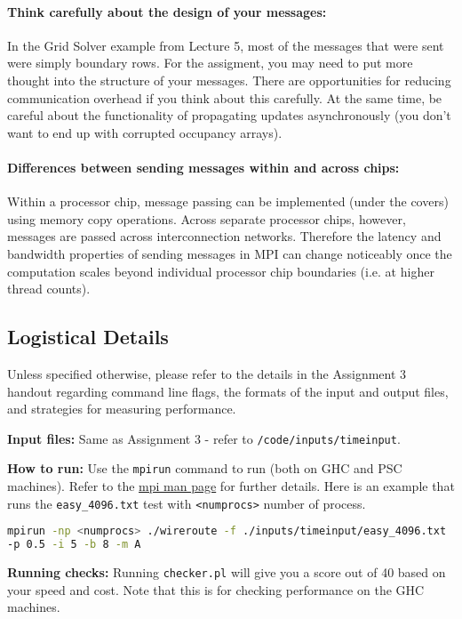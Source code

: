 \documentclass[11pt]{article}
\begin{document}
\paragraph{Think carefully about the design of your messages:}
In the Grid Solver example from Lecture 5, most of the messages that were sent were simply boundary rows. For the assigment, you may need to put more thought into the structure of your messages. There are opportunities for reducing communication overhead if you think about this carefully. At the same time, be careful about the functionality of propagating updates asynchronously (you don't want to end up with corrupted occupancy arrays).

\paragraph{Differences between sending messages within and across chips:}
Within a processor chip, message passing can be implemented (under the covers) using memory copy operations. Across separate processor chips, however, messages are passed across interconnection networks. Therefore the latency and bandwidth properties of sending messages in MPI can change noticeably once the computation scales beyond individual processor chip boundaries (i.e. at higher thread counts).

\subsection*{Logistical Details}

Unless specified otherwise, please refer to the details in the Assignment 3 handout regarding command line flags, the formats of the input and output files, and strategies for measuring performance.

\textbf{Input files:} Same as Assignment 3 - refer to \texttt{/code/inputs/timeinput}.

\textbf{How to run:} Use the \texttt{mpirun} command to run (both on GHC and PSC machines). Refer to the \href{https://www.open-mpi.org/doc/v4.0/man1/mpirun.1.php}{mpi man page} for further details. Here is an example that runs the \texttt{easy\_4096.txt} test with \texttt{<numprocs>} number of process.

\begin{lstlisting}[language=bash]
mpirun -np <numprocs> ./wireroute -f ./inputs/timeinput/easy_4096.txt
-p 0.5 -i 5 -b 8 -m A
\end{lstlisting}

\textbf{Running checks:} Running \texttt{checker.pl} will give you a score out of 40 based on your speed and cost. Note that this is for checking performance on the GHC machines.
\end{document}
